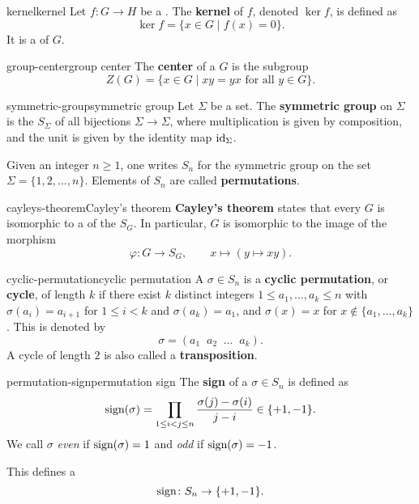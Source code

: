 \begin{topic}{kernel}{kernel}
    Let $f \colon G \to H$ be a . The \textbf{kernel} of $f$, denoted $\ker f$, is defined as
    \[ \ker f = \{ x \in G \mid f(x) = 0 \} . \]
    It is a   of $G$.
\end{topic}

\begin{topic}{group-center}{group center}
    The \textbf{center} of a  $G$ is the subgroup
    \[ Z(G) = \{ x \in G \mid xy = yx \text{ for all } y \in G \} . \]
\end{topic}

\begin{topic}{symmetric-group}{symmetric group}
    Let $\Sigma$ be a set. The \textbf{symmetric group} on $\Sigma$ is the  $S_\Sigma$ of all bijections $\Sigma \to \Sigma$, where multiplication is given by composition, and the unit is given by the identity map $\textup{id}_\Sigma$.
    
    Given an integer $n \ge 1$, one writes $S_n$ for the symmetric group on the set $\Sigma = \{ 1, 2, \ldots, n \}$. Elements of $S_n$ are called \textbf{permutations}.
\end{topic}

\begin{topic}{cayleys-theorem}{Cayley's theorem}
    \textbf{Cayley's theorem} states that every  $G$ is isomorphic to a  of the  $S_G$. In particular, $G$ is isomorphic to the image of the morphism
    \[ \varphi \colon G \to S_G, \qquad x \mapsto (y \mapsto xy) . \]
\end{topic}

\begin{topic}{cyclic-permutation}{cyclic permutation}
    A  $\sigma \in S_n$ is a \textbf{cyclic permutation}, or \textbf{cycle}, of length $k$ if there exist $k$ distinct integers $1 \le a_1, \ldots, a_k \le n$ with $\sigma(a_i) = a_{i + 1}$ for $1 \le i < k$ and $\sigma(a_k) = a_1$, and $\sigma(x) = x$ for $x \not\in \{ a_1, \ldots, a_k \}$. This is denoted by
    \[ \sigma = (a_1 \;\; a_2 \;\; \ldots \;\; a_k) . \]
    A cycle of length $2$ is also called a \textbf{transposition}.
\end{topic}

\begin{topic}{permutation-sign}{permutation sign}
    The \textbf{sign} of a  $\sigma \in S_n$ is defined as
    \[ \textup{sign}(\sigma) = \prod_{1 \le i < j \le n} \frac{\sigma(j) - \sigma(i)}{j - i} \in \{ +1, -1 \} . \]
    We call $\sigma$ \textit{even} if $\textup{sign}(\sigma) = 1$ and \textit{odd} if $\textup{sign}(\sigma) = -1$.
    
    This defines a 
    \[ \textup{sign} \colon S_n \to \{ +1, -1 \} . \]
\end{topic}

